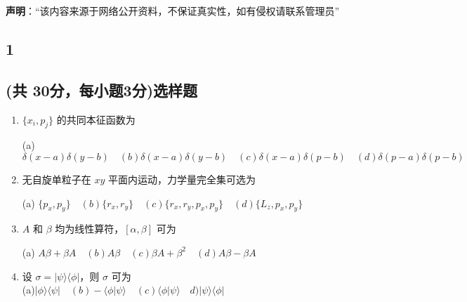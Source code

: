 
\textbf{声明}：“该内容来源于网络公开资料，不保证真实性，如有侵权请联系管理员”

\subsection{1}
\subsection{(共 30分，每小题3分)选样题}
\begin{enumerate}
    \item $\{x_i, p_j\}$ 的共同本征函数为 

(a) $\delta(x-a)\delta(y-b)\quad  (b) \delta(x-a)\delta(y-b) \quad (c) \delta(x-a)\delta(p-b) \quad (d) \delta(p-a)\delta(p-b)$

    
    \item 无自旋单粒子在 $xy$ 平面内运动，力学量完全集可选为 

(a) $\{p_x, p_y\} \quad (b) \{r_x, r_y\}\quad (c) \{r_x, r_y, p_x, p_y\}\quad (d) \{L_z, p_x, p_y\}$

    \item $A$ 和 $\beta$ 均为线性算符，$[\alpha, \beta]$ 可为 

(a) $A\beta + \beta A\quad (b) A\beta\quad (c) \beta A + \beta^2\quad (d) A\beta - \beta A$


    \item 设 $\sigma = |\psi\rangle \langle\phi|$，则 $\sigma$ 可为\\ 

(a)$|\phi\rangle \langle\psi| \quad (b) -\langle\phi|\psi\rangle \quad (c) \langle\phi|\psi\rangle\quad d) |\psi\rangle \langle\phi|$

\end{enumerate}
